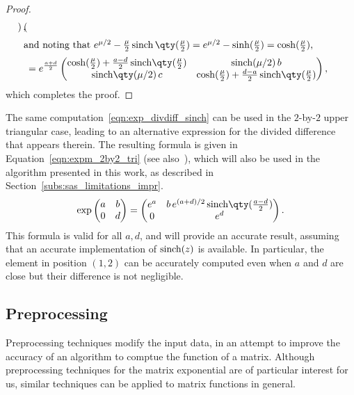 \begin{proof}
\begin{align*}
\begin{pmatrix}
        \end{pmatrix},\\
    \intertext{and noting that $e^{\mu/2}-\frac{\mu}{2}\sinch\qty(\frac{\mu}{2})=e^{\mu/2}-\sinh(\frac{\mu}{2})=\cosh(\frac{\mu}{2})$, }
        &= e^{\frac{a+d}{2}}
        \begin{pmatrix}
            \cosh(\frac{\mu}{2})+\frac{a-d}{2}\sinch\!\qty(\frac{\mu}{2}) & \sinch(\mu/2)\,b\\
            \sinch\!\qty(\mu/2)\,c & \cosh(\frac{\mu}{2})+\frac{d-a}{2}\sinch\!\qty(\frac{\mu}{2})
        \end{pmatrix},
    \end{align*}
    which completes the proof.
\end{proof}

\begin{oss}\label{oss:expm_2by2_tri}
	The same computation~\eqref{eqn:exp_divdiff_sinch} can be used in the $2$-by-$2$ upper triangular case, leading to an alternative expression for the divided difference that appears therein. The resulting formula is given in Equation~\eqref{eqn:expm_2by2_tri} (see also~\cite[§~10.4.3]{higham:matfun_book}), which will also be used in the algorithm presented in this work, as described in Section~\ref{subs:sas_limitations_impr}.
	\begin{equation}\label{eqn:expm_2by2_tri}
		\exp\begin{pmatrix} a & b \\ 0 & d \end{pmatrix}=
		\begin{pmatrix}
			e^a & b\,e^{(a+d)/2}\sinch\!\qty(\frac{a-d}{2})\\
			0	& e^d
		\end{pmatrix}.
	\end{equation}
	This formula is valid for all $a,d$, and will provide an accurate result, assuming that an accurate implementation of $\operatorname{sinch}(z)$ is available. In particular, the element in position $(1,2)$ can be accurately computed even when $a$ and $d$ are close but their difference is not negligible.
\end{oss}

\subsection{Preprocessing}\label{subs:preprocessing}
Preprocessing techniques modify the input data, in an attempt to improve the accuracy of an algorithm to comptue the function of a matrix. Although preprocessing techniques for the matrix exponential are of particular interest for us, similar techniques can be applied to matrix functions in general.

